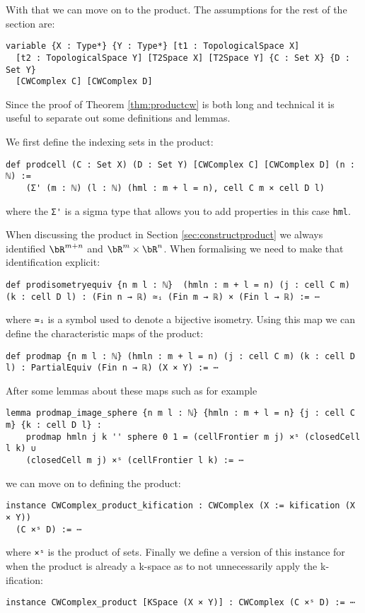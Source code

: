 With that we can move on to the product. 
The assumptions for the rest of the section are:

\begin{lstlisting}
variable {X : Type*} {Y : Type*} [t1 : TopologicalSpace X] 
  [t2 : TopologicalSpace Y] [T2Space X] [T2Space Y] {C : Set X} {D : Set Y} 
  [CWComplex C] [CWComplex D]
\end{lstlisting}

Since the proof of Theorem \ref{thm:productcw} is both long and technical it is useful to separate out some definitions and lemmas. 

We first define the indexing sets in the product:

\begin{lstlisting}
def prodcell (C : Set X) (D : Set Y) [CWComplex C] [CWComplex D] (n : ℕ) :=
    (Σ' (m : ℕ) (l : ℕ) (hml : m + l = n), cell C m × cell D l)
\end{lstlisting}

where the \lstinline{Σ'} is a sigma type that allows you to add properties in this case \lstinline{hml}. 

When discussing the product in Section \ref{sec:constructproduct} we always identified $\bR^{m + n}$ and $\bR^m \times \bR^n$. 
When formalising we need to make that identification explicit: 

\begin{lstlisting}
def prodisometryequiv {n m l : ℕ}  (hmln : m + l = n) (j : cell C m) (k : cell D l) : (Fin n → ℝ) ≃ᵢ (Fin m → ℝ) × (Fin l → ℝ) := ⋯
\end{lstlisting}

where \lstinline{≃ᵢ} is a symbol used to denote a bijective isometry. 
Using this map we can define the characteristic maps of the product: 

\begin{lstlisting}
def prodmap {n m l : ℕ} (hmln : m + l = n) (j : cell C m) (k : cell D l) : PartialEquiv (Fin n → ℝ) (X × Y) := ⋯
\end{lstlisting}

After some lemmas about these maps such as for example 

\begin{lstlisting}
lemma prodmap_image_sphere {n m l : ℕ} {hmln : m + l = n} {j : cell C m} {k : cell D l} :
    prodmap hmln j k '' sphere 0 1 = (cellFrontier m j) ×ˢ (closedCell l k) ∪
    (closedCell m j) ×ˢ (cellFrontier l k) := ⋯
\end{lstlisting}

we can move on to defining the product: 

\begin{lstlisting}
instance CWComplex_product_kification : CWComplex (X := kification (X × Y)) 
  (C ×ˢ D) := ⋯
\end{lstlisting}

where \lstinline{×ˢ} is the product of sets.
Finally we define a version of this instance for when the product is already a k-space as to not unnecessarily apply the k-ification: 

\begin{lstlisting}
instance CWComplex_product [KSpace (X × Y)] : CWComplex (C ×ˢ D) := ⋯
\end{lstlisting}